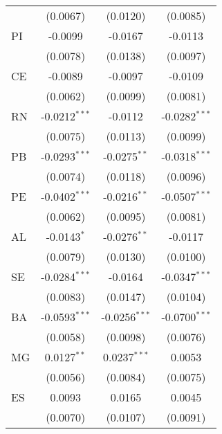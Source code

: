 \begin{tabular}{lccc}
                   & (0.0067)                & (0.0120)                & (0.0085)\\   
   PI              & -0.0099                 & -0.0167                 & -0.0113\\   
                   & (0.0078)                & (0.0138)                & (0.0097)\\   
   CE              & -0.0089                 & -0.0097                 & -0.0109\\   
                   & (0.0062)                & (0.0099)                & (0.0081)\\   
   RN              & -0.0212$^{***}$         & -0.0112                 & -0.0282$^{***}$\\   
                   & (0.0075)                & (0.0113)                & (0.0099)\\   
   PB              & -0.0293$^{***}$         & -0.0275$^{**}$          & -0.0318$^{***}$\\   
                   & (0.0074)                & (0.0118)                & (0.0096)\\   
   PE              & -0.0402$^{***}$         & -0.0216$^{**}$          & -0.0507$^{***}$\\   
                   & (0.0062)                & (0.0095)                & (0.0081)\\   
   AL              & -0.0143$^{*}$           & -0.0276$^{**}$          & -0.0117\\   
                   & (0.0079)                & (0.0130)                & (0.0100)\\   
   SE              & -0.0284$^{***}$         & -0.0164                 & -0.0347$^{***}$\\   
                   & (0.0083)                & (0.0147)                & (0.0104)\\   
   BA              & -0.0593$^{***}$         & -0.0256$^{***}$         & -0.0700$^{***}$\\   
                   & (0.0058)                & (0.0098)                & (0.0076)\\   
   MG              & 0.0127$^{**}$           & 0.0237$^{***}$          & 0.0053\\   
                   & (0.0056)                & (0.0084)                & (0.0075)\\   
   ES              & 0.0093                  & 0.0165                  & 0.0045\\   
                   & (0.0070)                & (0.0107)                & (0.0091)\\   

\end{tabular}
